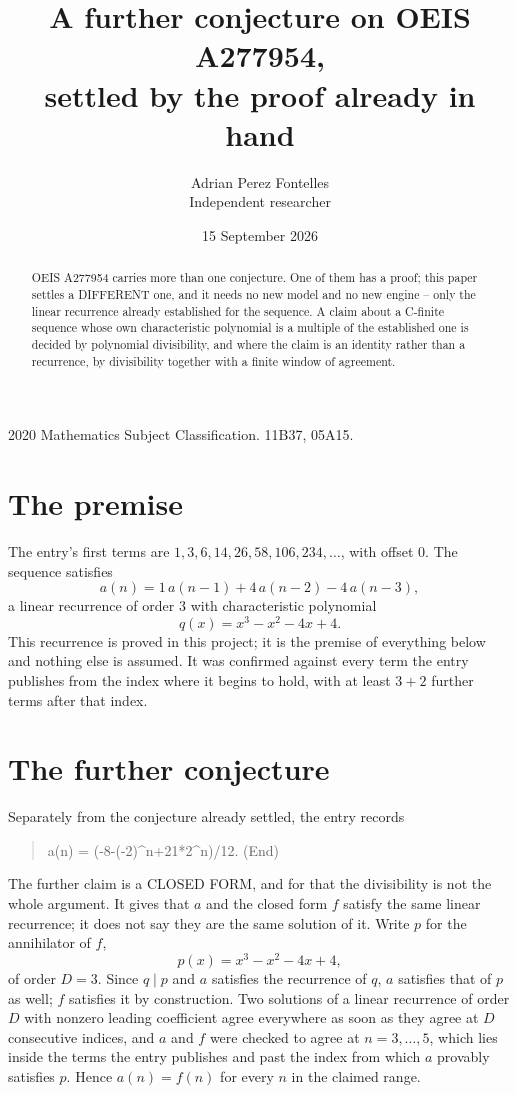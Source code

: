 \documentclass[11pt,a4paper]{article}
\title{A further conjecture on OEIS A277954,\\ \large settled by the proof already in hand}
\author{Adrian Perez Fontelles\\ \small Independent researcher}
\date{15 September 2026}
\theoremstyle{plain}
\theoremstyle{definition}
\begin{document}
\maketitle

\begin{abstract}
OEIS A277954 carries more than one conjecture. One of them has a proof; this paper settles a
DIFFERENT one, and it needs no new model and no new engine -- only the linear recurrence already
established for the sequence. A claim about a C-finite sequence whose own characteristic
polynomial is a multiple of the established one is decided by polynomial divisibility, and where
the claim is an identity rather than a recurrence, by divisibility together with a finite window
of agreement.
\end{abstract}

\noindent\small 2020 Mathematics Subject Classification. 11B37, 05A15.\normalsize

\section{The premise}

The entry's first terms are $1, 3, 6, 14, 26, 58, 106, 234,\dots$, with offset $0$. The sequence satisfies
\[
  a(n)=1\,a(n-1) + 4\,a(n-2) - 4\,a(n-3) ,
\]
a linear recurrence of order $3$ with characteristic polynomial
\[
  q(x)=x^{3} - x^{2} - 4 x + 4 .
\]
This recurrence is proved in this project; it is the premise of everything below and nothing else is assumed.
It was confirmed against every term the entry publishes from the index where it begins to hold,
with at least $3+2$ further terms after that index.

\section{The further conjecture}

Separately from the conjecture already settled, the entry records

\begin{quote}\raggedright a(n) = (-8-(-2)\^{}n+21*2\^{}n)/12. (End)\end{quote}

The further claim is a CLOSED FORM, and for that the divisibility is not the whole argument. It
gives that $a$ and the closed form $f$ satisfy the same linear recurrence; it does not say they
are the same solution of it. Write $p$ for the annihilator of $f$,
\[
  p(x)=x^{3} - x^{2} - 4 x + 4 ,
\]
of order $D=3$. Since $q\mid p$ and $a$ satisfies the recurrence of $q$, $a$ satisfies that of
$p$ as well; $f$ satisfies it by construction. Two solutions of a linear recurrence of order $D$
with nonzero leading coefficient agree everywhere as soon as they agree at $D$ consecutive
indices, and $a$ and $f$ were checked to agree at $n=3,\dots,5$,
which lies inside the terms the entry publishes and past the index from which $a$ provably
satisfies $p$. Hence $a(n)=f(n)$ for every $n$ in the claimed range.
\end{document}
